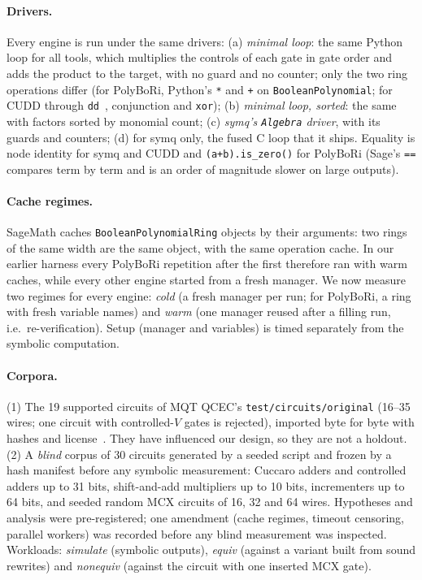 \documentclass[10pt,a4paper]{article}
\theoremstyle{definition}
\newcommand{\symq}{\textsf{symq}}
\begin{document}
\paragraph{Drivers.} Every engine is run under the same drivers: (a) \emph{minimal loop}: the
same Python loop for all tools, which multiplies the controls of each gate in gate order and
adds the product to the target, with no guard and no counter; only the two ring operations
differ (for PolyBoRi, Python's \texttt{*} and \texttt{+} on \texttt{BooleanPolynomial}; for
CUDD through \texttt{dd}~\cite{dd060}, conjunction and \texttt{xor}); (b) \emph{minimal loop,
sorted}: the same with factors sorted by monomial count; (c) \emph{\symq{}'s
\texttt{Algebra} driver}, with its guards and counters; (d) for \symq{} only, the fused C
loop that it ships. Equality is node identity for \symq{} and CUDD and
\texttt{(a+b).is\_zero()} for PolyBoRi (Sage's \texttt{==} compares term by term and is an
order of magnitude slower on large outputs).

\paragraph{Cache regimes.} SageMath caches \texttt{BooleanPolynomialRing} objects by their
arguments: two rings of the same width are the same object, with the same operation cache.
In our earlier harness every PolyBoRi repetition after the first therefore ran with warm
caches, while every other engine started from a fresh manager. We now measure two regimes for
every engine: \emph{cold} (a fresh manager per run; for PolyBoRi, a ring with fresh variable
names) and \emph{warm} (one manager reused after a filling run, i.e.\ re-verification).
Setup (manager and variables) is timed separately from the symbolic computation.

\paragraph{Corpora.} (1) The 19 supported circuits of MQT QCEC's
\texttt{test/circuits/original} (16--35 wires; one circuit with controlled-$V$ gates is
rejected), imported byte for byte with hashes and license~\cite{qcecrepo}. They have
influenced our design, so they are not a holdout. (2) A \emph{blind} corpus of 30 circuits
generated by a seeded script and frozen by a hash manifest before any symbolic measurement:
Cuccaro adders and controlled adders up to 31 bits, shift-and-add multipliers up to 10 bits,
incrementers up to 64 bits, and seeded random MCX circuits of 16, 32 and 64 wires. Hypotheses
and analysis were pre-registered; one amendment (cache regimes, timeout censoring, parallel
workers) was recorded before any blind measurement was inspected. Workloads: \emph{simulate}
(symbolic outputs), \emph{equiv} (against a variant built from sound rewrites) and
\emph{nonequiv} (against the circuit with one inserted MCX gate).
\end{document}
